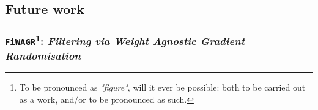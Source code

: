 

\subsection{Future work}

\subsubsection[\texttt{FiWAGR}: \textit{Filtering via Weight Agnostic Gradient Randomisation}]{\texttt{FiWAGR}\protect\footnote{To be pronounced as \textit{"figure"}, will it ever be possible: both to be carried out as a work, and/or to be pronounced as such.}: \textit{Filtering via Weight Agnostic Gradient Randomisation}}
